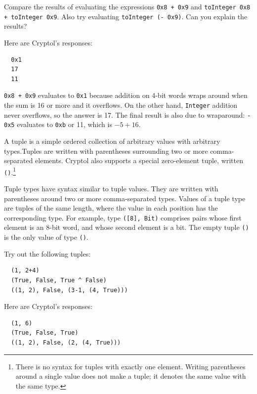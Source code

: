 \begin{Exercise}\label{ex:int:1}
  Compare the results of evaluating the expressions \texttt{0x8 + 0x9}
  and \texttt{toInteger 0x8 + toInteger 0x9}. Also try evaluating
  \texttt{toInteger (- 0x9)}. Can you explain the results?
\end{Exercise}
\begin{Answer}
Here are Cryptol's responses:
\begin{Verbatim}
  0x1
  17
  11
\end{Verbatim}
\texttt{0x8 + 0x9} evaluates to \texttt{0x1} because addition on 4-bit
words wraps around when the sum is 16 or more and it overflows. On the
other hand, \texttt{Integer} addition never overflows, so the answer
is 17. The final result is also due to wraparound: \texttt{- 0x5}
evaluates to \texttt{0xb} or 11, which is $-5 + 16$.
\end{Answer}


A tuple is a simple ordered collection of arbitrary values with
arbitrary types.\indTheTupleType Tuples are written with parentheses
surrounding two or more comma-separated elements. Cryptol also
supports a special zero-element tuple, written
\texttt{()}.\footnote{There is no syntax for tuples with exactly one
  element. Writing parentheses around a single value does not make a
  tuple; it denotes the same value with the same type.}

Tuple types have syntax similar to tuple values. They are written with
parentheses around two or more comma-separated types. Values of a
tuple type are tuples of the same length, where the value in each
position has the corresponding type. For example, type \texttt{([8],
  Bit)} comprises pairs whose first element is an 8-bit word, and whose
second element is a bit. The empty tuple \texttt{()} is the only value
of type \texttt{()}.

\begin{Exercise}\label{ex:tup:1}
Try out the following tuples:
\begin{Verbatim}
  (1, 2+4)
  (True, False, True ^ False)
  ((1, 2), False, (3-1, (4, True)))
\end{Verbatim}
\end{Exercise}
\begin{Answer}
Here are Cryptol's responses:
\begin{Verbatim}
  (1, 6)
  (True, False, True)
  ((1, 2), False, (2, (4, True)))
\end{Verbatim}
\end{Answer}

